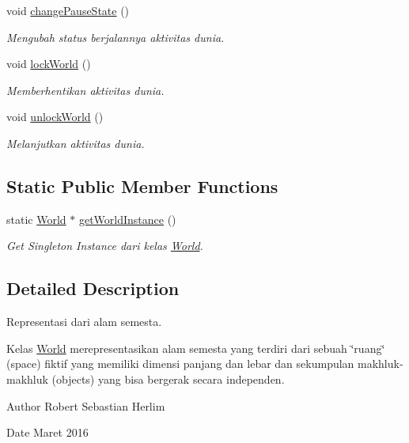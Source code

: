 \begin{DoxyCompactItemize}
void \hyperlink{class_world_a1df17b17270667dc2ff9ff52f6ade6c0}{change\+Pause\+State} ()
\begin{DoxyCompactList}\small\item\em Mengubah status berjalannya aktivitas dunia. \end{DoxyCompactList}\item 
void \hyperlink{class_world_a63197059e4c4f18349aec3c1daa66a01}{lock\+World} ()
\begin{DoxyCompactList}\small\item\em Memberhentikan aktivitas dunia. \end{DoxyCompactList}\item 
void \hyperlink{class_world_a08481fdff65e290c44386676ce993dce}{unlock\+World} ()
\begin{DoxyCompactList}\small\item\em Melanjutkan aktivitas dunia. \end{DoxyCompactList}\end{DoxyCompactItemize}
\subsection*{Static Public Member Functions}
\begin{DoxyCompactItemize}
\item 
static \hyperlink{class_world}{World} $\ast$ \hyperlink{class_world_a7a8d0b3f76f0ecde36ffe28f9b08f30f}{get\+World\+Instance} ()
\begin{DoxyCompactList}\small\item\em Get Singleton Instance dari kelas \hyperlink{class_world}{World}. \end{DoxyCompactList}\end{DoxyCompactItemize}


\subsection{Detailed Description}
Representasi dari alam semesta. 

Kelas \hyperlink{class_world}{World} merepresentasikan alam semesta yang terdiri dari sebuah \char`\"{}ruang\char`\"{} (space) fiktif yang memiliki dimensi panjang dan lebar dan sekumpulan makhluk-\/makhluk (objects) yang bisa bergerak secara independen. \begin{DoxyAuthor}{Author}
Robert Sebastian Herlim 
\end{DoxyAuthor}
\begin{DoxyDate}{Date}
Maret 2016 
\end{DoxyDate}


